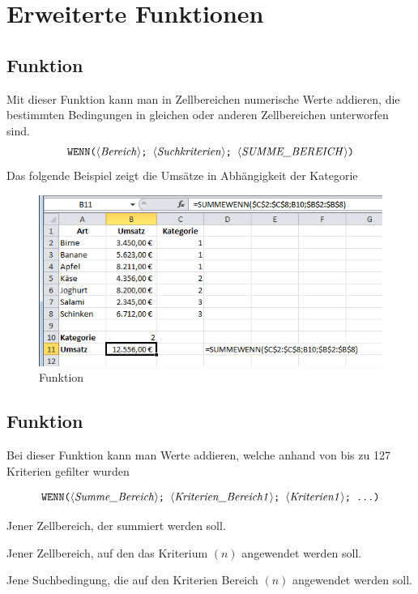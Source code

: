 
\section{Erweiterte  Funktionen}

\subsection{ Funktion}

Mit dieser Funktion kann man in Zellbereichen numerische Werte addieren, die bestimmten Bedingungen in gleichen oder anderen Zellbereichen unterworfen sind.%
$$ \text{\stmt{WENN(\syntax{Bereich}; \syntax{Suchkriterien}; \syntax{SUMME\_BEREICH})}}$$%
%
Das folgende Beispiel zeigt die Umsätze in Abhängigkeit der Kategorie%
	\begin{figure}[H]
		\centering
			\includegraphics[scale=0.7]{images/summewenn}
		\caption{ Funktion}
		\label{fig:summewenn}
	\end{figure}

\subsection{ Funktion}

Bei dieser Funktion kann man Werte addieren, welche anhand von bis zu 127 Kriterien gefilter wurden

$$ \text{\stmt{WENN(\syntax{Summe\_Bereich}; \syntax{Kriterien\_Bereich1}; \syntax{Kriterien1}; \ldots)}}$$%
%
\begin{description}[labelindent=0cm, leftmargin=4cm, font=\mdseries, labelwidth=3cm,style=nextline]
\smallitemize
\item[\syntax{Summe\_Bereich}] Jener Zellbereich, der summiert werden soll.
\item[\syntax{Kriterien\_Bereich1}] Jener Zellbereich, auf den das Kriterium $(n)$ angewendet werden soll.
\item[\syntax{Kriterien1}] Jene Suchbedingung, die auf den Kriterien Bereich $(n)$ angewendet werden soll.
\end{description}

